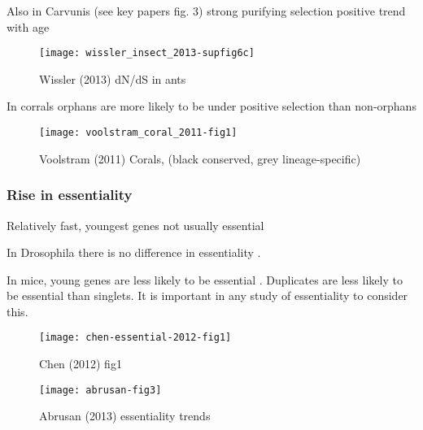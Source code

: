         Also in Carvunis (see key papers fig. 3) strong purifying selection
        positive trend with age \cite{carvunis_proto-genes_2012}

        \begin{figure}[!hbpt] \centering
            \texttt{[image: wissler\_insect\_2013-supfig6c]}
            \caption{ Wissler (2013) dN/dS in ants
                \cite{wissler_mechanisms_2013} } \end{figure}

        In corrals orphans are more likely to be under positive selection
        than non-orphans \cite{voolstra_rapid_2011}

        \begin{figure}[!hbpt] \centering
            \texttt{[image: voolstram\_coral\_2011-fig1]}
            \caption{ Voolstram (2011) Corals, (black conserved, grey
                lineage-specific) \cite{voolstra_rapid_2011} } \end{figure}



        \FloatBarrier

    \subsubsection{Rise in essentiality}

        Relatively fast, youngest genes not usually essential
        \cite{abrusan_integration_2013}

        In Drosophila there is no difference in essentiality
        \cite{chen_new_2010}. 

        In mice, young genes are less likely to be essential
        \cite{chen_younger_2012}. Duplicates are less likely to be essential
        than singlets. It is important in any study of essentiality to consider
        this.

        \begin{figure}[!hbpt]
            \centering
            \texttt{[image: chen-essential-2012-fig1]}
            \caption{Chen (2012) fig1 \cite{chen_younger_2012}}
        \end{figure}

        \begin{figure}[!hbpt] \centering
            \texttt{[image: abrusan-fig3]}
            \caption{Abrusan (2013) essentiality trends}
        \end{figure}
        \FloatBarrier



